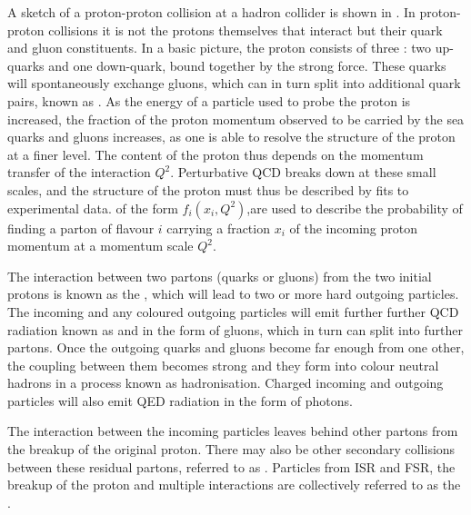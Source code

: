 A sketch of a proton-proton collision at a hadron collider is shown in
. In proton-proton collisions it is not the
protons themselves that interact but their quark and gluon constituents.
In a basic picture, the proton consists of three :
two up-quarks and one down-quark, bound together by the strong force. These
quarks will spontaneously exchange gluons, which can in turn split into
additional quark pairs, known as . As the energy of a
particle used to probe the proton is increased, the fraction of the proton
momentum observed to be carried by the sea quarks and gluons increases, as one
is able to resolve the structure of the proton at a finer level. The content of
the proton thus depends on the momentum transfer of the interaction $Q^{2}$.
Perturbative QCD breaks down at these small scales, and the structure of the
proton must thus be described by fits to experimental data.  of the form $f_{i}(x_{i}, Q^{2})$,are used to describe the probability of finding a parton of flavour $i$ carrying a
fraction $x_i$ of the incoming proton momentum at a momentum scale $Q^{2}$.

The interaction between two  partons (quarks or gluons) from the two initial
protons is known as the , which will lead to two or more
hard outgoing particles. The incoming and any coloured outgoing particles will
emit further further QCD radiation known as  
and  in the form of gluons, which in turn can
split into further partons. Once the outgoing quarks and gluons become far enough from
one other, the coupling between them becomes strong and they form into colour neutral
hadrons in a process known as hadronisation. Charged incoming and outgoing
particles will also emit QED radiation in the form of photons. 

The interaction between the incoming
particles leaves behind other partons from the breakup of the original proton.
There may also be other secondary collisions between these residual partons,
referred to as . Particles from ISR and FSR, the breakup of the proton and
multiple interactions are collectively referred to as the .

